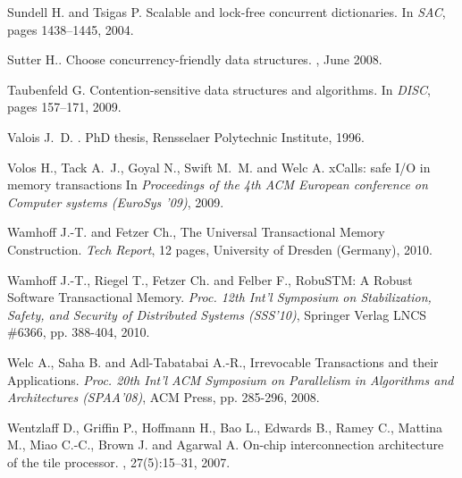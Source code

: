 \begin{thebibliography}{99}
{
Sundell H. and Tsigas P.
\newblock Scalable and lock-free concurrent dictionaries.
\newblock In {\em SAC}, pages 1438--1445, 2004.



Sutter H..
\newblock Choose concurrency-friendly data structures.
, June 2008.


Taubenfeld G.
\newblock Contention-sensitive data structures and algorithms.
\newblock In {\em DISC}, pages 157--171, 2009.




Valois J.~D.
.
\newblock PhD thesis, Rensselaer Polytechnic Institute, 1996.


Volos H., Tack A.~J., Goyal N., Swift M.~M. and Welc A.
\newblock xCalls: safe I/O in memory transactions
\newblock In {\em Proceedings of the 4th ACM European conference on Computer systems (EuroSys '09)}, 2009.


Wamhoff J.-T. and   Fetzer Ch., 
The Universal Transactional Memory Construction. 
{\it Tech Report}, 12 pages, University of Dresden (Germany), 2010. 
 

Wamhoff J.-T.,   Riegel T.,  Fetzer Ch. and  Felber F., 
RobuSTM: A Robust Software Transactional Memory.
{\it Proc. 12th Int'l Symposium on  Stabilization, Safety, and Security 
of Distributed Systems (SSS'10)}, 
Springer Verlag LNCS \#6366, pp.  388-404,  2010. 

Welc A., Saha B. and Adl-Tabatabai A.-R., 
Irrevocable Transactions and their Applications. 
{\it  Proc. 20th  Int'l  ACM Symposium on Parallelism in Algorithms 
and Architectures   (SPAA'08)},  ACM Press, pp. 285-296,  2008. 


Wentzlaff D., Griffin P., Hoffmann H., Bao L., Edwards B., Ramey C.,
  Mattina M., Miao C.-C., Brown J. and Agarwal A.
\newblock On-chip interconnection architecture of the tile processor.
, 27(5):15--31, 2007.


}
\end{thebibliography}
